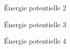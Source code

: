 


\begin{enonce}
	Énergie potentielle \no{}2
\end{enonce}

\reponse{\reponseD{}}




\begin{enonce}
	Énergie potentielle \no{}3	
\end{enonce}

\reponse{\reponseA{}}




\begin{enonce}
	Énergie potentielle \no{}4	
\end{enonce}

\reponse{\reponseC{}}



\finEntrainement







\hauteurLargeurCadreReponse		{8mm}{4cm}
\typeEntrainement				{} %
\initialisationEntrainement

